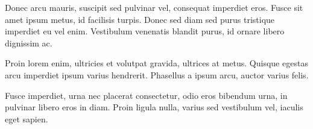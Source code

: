 Donec arcu mauris, suscipit sed pulvinar vel, consequat imperdiet eros. Fusce sit amet ipsum metus, id facilisis turpis. Donec sed diam sed purus tristique imperdiet eu vel enim. Vestibulum venenatis blandit purus, id ornare libero dignissim ac.

\begin{info}
Proin lorem enim, ultricies et volutpat gravida, ultrices at metus. Quisque egestas arcu imperdiet ipsum varius hendrerit. Phasellus a ipsum arcu, auctor varius felis.
\end{info}

Fusce imperdiet, urna nec placerat consectetur, odio eros bibendum urna, in pulvinar libero eros in diam. Proin ligula nulla, varius sed vestibulum vel, iaculis eget sapien.

